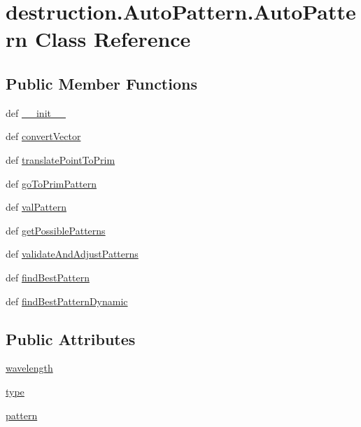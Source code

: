 \hypertarget{classdestruction_1_1_auto_pattern_1_1_auto_pattern}{\section{destruction.\-Auto\-Pattern.\-Auto\-Pattern Class Reference}
\label{classdestruction_1_1_auto_pattern_1_1_auto_pattern}
}
\subsection*{Public Member Functions}
\begin{DoxyCompactItemize}
\item 
def \hyperlink{classdestruction_1_1_auto_pattern_1_1_auto_pattern_a9b1aef7d088a77e02d907b9a45c8c0ca}{\-\_\-\-\_\-init\-\_\-\-\_\-}
\item 
def \hyperlink{classdestruction_1_1_auto_pattern_1_1_auto_pattern_a52937cb7ab4bb85c51c165f8f663efe4}{convert\-Vector}
\item 
def \hyperlink{classdestruction_1_1_auto_pattern_1_1_auto_pattern_a4cd53982f97356fa674a2aef5050d115}{translate\-Point\-To\-Prim}
\item 
def \hyperlink{classdestruction_1_1_auto_pattern_1_1_auto_pattern_a42348222dbaae00c18b63195b8802b39}{go\-To\-Prim\-Pattern}
\item 
def \hyperlink{classdestruction_1_1_auto_pattern_1_1_auto_pattern_a1bd105d0fb2817408fd050be6d9a5178}{val\-Pattern}
\item 
def \hyperlink{classdestruction_1_1_auto_pattern_1_1_auto_pattern_a95559ab801cba72baf4b4cc409252326}{get\-Possible\-Patterns}
\item 
def \hyperlink{classdestruction_1_1_auto_pattern_1_1_auto_pattern_a4356f64ac61dd809abf3b34b8764c699}{validate\-And\-Adjust\-Patterns}
\item 
def \hyperlink{classdestruction_1_1_auto_pattern_1_1_auto_pattern_ae20d226d1623d20f5b8f6c89c99c4c5c}{find\-Best\-Pattern}
\item 
def \hyperlink{classdestruction_1_1_auto_pattern_1_1_auto_pattern_af9bb6287410e63c22513a31dc129a3f8}{find\-Best\-Pattern\-Dynamic}
\end{DoxyCompactItemize}
\subsection*{Public Attributes}
\begin{DoxyCompactItemize}
\item 
\hyperlink{classdestruction_1_1_auto_pattern_1_1_auto_pattern_a613cf32a6add0704adc926eb4f88dd61}{wavelength}
\item 
\hyperlink{classdestruction_1_1_auto_pattern_1_1_auto_pattern_a545d19cbea289efd27454aa926d2afa7}{type}
\item 
\hyperlink{classdestruction_1_1_auto_pattern_1_1_auto_pattern_a4c1f708cce5cef7e43de1bbcad455c77}{pattern}
\end{DoxyCompactItemize}


